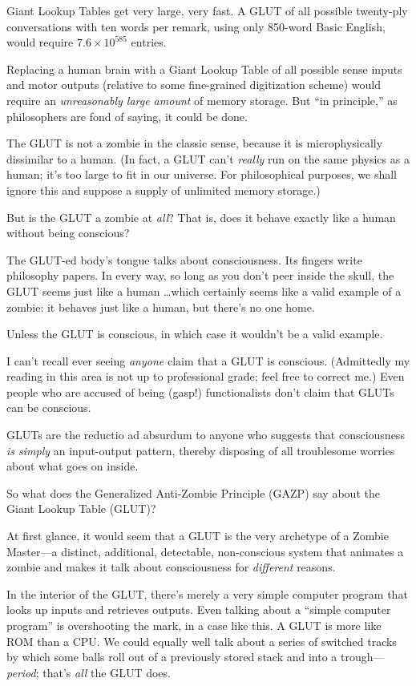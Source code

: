 {
 Giant Lookup Tables get very large, very fast. A GLUT of all
possible twenty-ply conversations with ten words per remark, using only
850-word Basic English, would require $7.6 \times 10^{585}$ entries.}

{
 Replacing a human brain with a Giant Lookup Table of all possible
sense inputs and motor outputs (relative to some fine-grained
digitization scheme) would require an \textit{unreasonably large
amount} of memory storage. But ``in
principle,'' as philosophers are fond of saying, it
could be done.}

{
 The GLUT is not a zombie in the classic sense, because it is
microphysically dissimilar to a human. (In fact, a GLUT
can't \textit{really} run on the same physics as a
human; it's too large to fit in our universe. For
philosophical purposes, we shall ignore this and suppose a supply of
unlimited memory storage.)}

{
 But is the GLUT a zombie at \textit{all}? That is, does it behave
exactly like a human without being conscious?}

{
 The GLUT-ed body's tongue talks about
consciousness. Its fingers write philosophy papers. In every way, so
long as you don't peer inside the skull, the GLUT seems
just like a human \ldots which certainly seems like a valid example of a
zombie: it behaves just like a human, but there's no
one home.}

{
 Unless the GLUT is conscious, in which case it
wouldn't be a valid example.}

{
 I can't recall ever seeing \textit{anyone} claim
that a GLUT is conscious. (Admittedly my reading in this area is not up
to professional grade; feel free to correct me.) Even people who are
accused of being (gasp!) functionalists don't claim
that GLUTs can be conscious.}

{
 GLUTs are the reductio ad absurdum to anyone who suggests that
consciousness \textit{is simply} an input-output pattern, thereby
disposing of all troublesome worries about what goes on inside.}

{
 So what does the Generalized Anti-Zombie Principle (GAZP) say
about the Giant Lookup Table (GLUT)?}

{
 At first glance, it would seem that a GLUT is the very archetype
of a Zombie Master---a distinct, additional, detectable, non-conscious
system that animates a zombie and makes it talk about consciousness for
\textit{different} reasons.}

{
 In the interior of the GLUT, there's merely a very
simple computer program that looks up inputs and retrieves outputs.
Even talking about a ``simple computer
program'' is overshooting the mark, in a case like
this. A GLUT is more like ROM than a CPU. We could equally well talk
about a series of switched tracks by which some balls roll out of a
previously stored stack and into a trough---\textit{period};
that's \textit{all} the GLUT does.}

